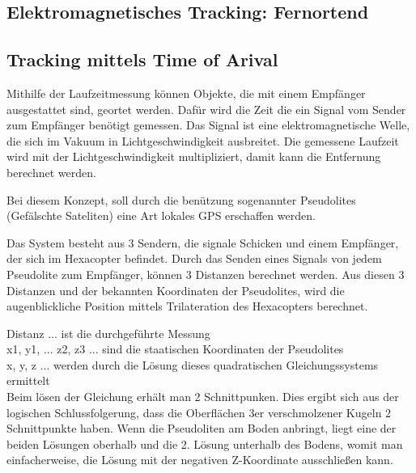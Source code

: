     \subsection{Elektromagnetisches Tracking: Fernortend}

      \subsection*{Tracking mittels Time of Arival}
      Mithilfe der Laufzeitmessung können Objekte, die mit einem Empfänger ausgestattet sind, geortet werden. Dafür wird die Zeit die ein Signal vom Sender zum Empfänger benötigt gemessen. Das Signal ist eine elektromagnetische Welle, die sich im Vakuum in Lichtgeschwindigkeit ausbreitet. Die gemessene Laufzeit wird mit der Lichtgeschwindigkeit multipliziert, damit kann die Entfernung berechnet werden. 

      Bei diesem Konzept, soll durch die benützung sogenannter Pseudolites (Gefälschte Sateliten) eine Art lokales GPS erschaffen werden.

      Das System besteht aus 3 Sendern, die signale Schicken und einem Empfänger, der sich im Hexacopter befindet.
      Durch das Senden eines Signals von jedem Pseudolite zum Empfänger, können 3 Distanzen berechnet werden.
      Aus diesen 3 Distanzen und der bekannten Koordinaten der Pseudolites, wird die augenblickliche Position mittels Trilateration des Hexacopters berechnet.


      Distanz ... ist die durchgeführte Messung\\
      x1, y1, ... z2, z3 ... sind die staatischen Koordinaten der Pseudolites \\
      x, y, z ... werden durch die Lösung dieses quadratischen Gleichungssystems ermittelt \\
      
      Beim lösen der Gleichung erhält man 2 Schnittpunken. Dies ergibt sich aus der logischen Schlussfolgerung, dass die Oberflächen 3er verschmolzener Kugeln 2 Schnittpunkte haben.
      Wenn die Pseudoliten am Boden anbringt, liegt eine der beiden Lösungen oberhalb und die 2. Lösung unterhalb des Bodens, womit man einfacherweise, die Lösung mit der negativen Z-Koordinate ausschließen kann.


